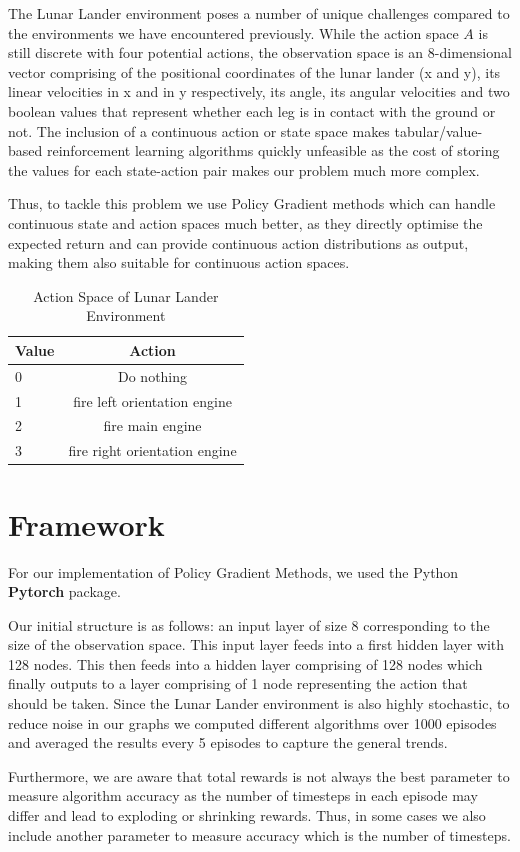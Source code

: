\documentclass{article}
\begin{document}
The Lunar Lander environment poses a number of unique challenges compared to the environments we have encountered previously. While the action space $A$ is still discrete with four potential actions, the observation space is an 8-dimensional vector comprising of the positional coordinates of the lunar lander (x and y), its linear velocities in x and in y respectively, its angle, its angular velocities and two boolean values that represent whether each leg is in contact with the ground or not. The inclusion of a continuous action or state space makes tabular/value-based reinforcement learning algorithms quickly unfeasible as the cost of storing the values for each state-action pair makes our problem much more complex. 
\par Thus, to tackle this problem we use Policy Gradient methods which can handle continuous state and action spaces much better, as they directly optimise the expected return and can provide continuous action distributions as output, making them also suitable for continuous action spaces.

\begin{table}[htbp]
\centering
\begin{tabular}{|l|c|}
\hline
\textbf{Value} & \textbf{Action} \\
\hline
0  & Do nothing \\
\hline
1 & fire left orientation engine \\
\hline
2  & fire main engine \\
\hline
3 & fire right orientation engine  \\
\hline
\end{tabular}
\caption{Action Space of Lunar Lander Environment}
\label{tab:hyper-parameters}
\end{table}



\section{Framework}
For our implementation of Policy Gradient Methods, we used the Python \textbf{Pytorch} package. 
\par Our initial structure is as follows: an input layer of size 8 corresponding to the size of the observation space. This input layer feeds into a first hidden layer with 128 nodes. This then feeds into a hidden layer comprising of 128 nodes which finally outputs to a layer comprising of 1 node representing the action that should be taken. Since the Lunar Lander environment is also highly stochastic, to reduce noise in our graphs we computed different algorithms over 1000 episodes and averaged the results every 5 episodes to capture the general trends. 
\par Furthermore, we are aware that total rewards is not always the best parameter to measure algorithm accuracy as the number of timesteps in each episode may differ and lead to exploding or shrinking rewards. Thus, in some cases we also include another parameter to measure accuracy which is the number of timesteps.
\end{document}
